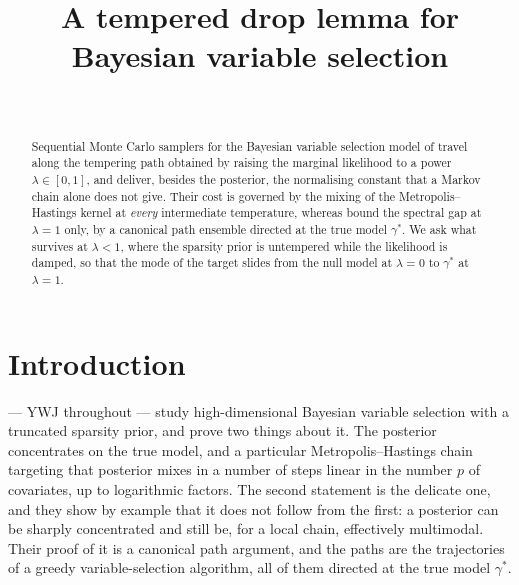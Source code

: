 \documentclass[aos]{imsart}
\theoremstyle{plain}
\theoremstyle{definition}
\begin{document}
    \begin{frontmatter}
        \title{A tempered drop lemma for Bayesian variable selection}

        \begin{aug}
            \author[A]{~}
            \address[A]{CREST, ENSAE, IP Paris}
        \end{aug}

        \begin{abstract}
            Sequential Monte Carlo samplers for the Bayesian variable
            selection model of \citet{YangWainwrightJordan2016} travel along
            the tempering path obtained by raising the marginal likelihood to
            a power $\lambda\in[0,1]$, and deliver, besides the posterior,
            the normalising constant that a Markov chain alone does not give.
            Their cost is governed by the mixing of the Metropolis--Hastings
            kernel at \emph{every} intermediate temperature, whereas
            \citet{YangWainwrightJordan2016} bound the spectral gap at
            $\lambda=1$ only, by a canonical path ensemble directed at the
            true model $\gamma^{\ast}$. We ask what survives at $\lambda<1$,
            where the sparsity prior is untempered while the likelihood is
            damped, so that the mode of the target slides from the null model
            at $\lambda=0$ to $\gamma^{\ast}$ at $\lambda=1$.
        \end{abstract}
    \end{frontmatter}

    \maketitle


    \section{Introduction}
    \label{sec:intro}

    \citet{YangWainwrightJordan2016} --- YWJ throughout --- study
    high-dimensional Bayesian variable selection with a truncated sparsity
    prior, and prove two things about it. The posterior concentrates on the
    true model, and a particular Metropolis--Hastings chain targeting that
    posterior mixes in a number of steps linear in the number $p$ of
    covariates, up to logarithmic factors. The second statement is the
    delicate one, and they show by example that it does not follow from the
    first: a posterior can be sharply concentrated and still be, for a local
    chain, effectively multimodal. Their proof of it is a canonical path
    argument, and the paths are the trajectories of a greedy
    variable-selection algorithm, all of them directed at the true model
    $\gamma^{\ast}$.
\end{document}
